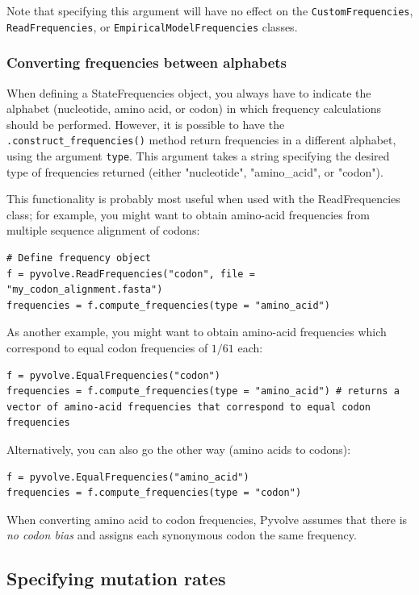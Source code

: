 \documentclass{article}
\newcommand{\code}[1]{\texttt{\small{#1}}}
\begin{document}
Note that specifying this argument will have no effect on the \code{CustomFrequencies}, \code{ReadFrequencies}, or \code{EmpiricalModelFrequencies} classes.






\subsubsection{Converting frequencies between alphabets}

When defining a StateFrequencies object, you always have to indicate the alphabet (nucleotide, amino acid, or codon) in which frequency calculations should be performed. However, it is possible to have the \code{.construct\_frequencies()} method return frequencies in a different alphabet, using the argument \code{type}. This argument takes a string specifying the desired type of frequencies returned (either "nucleotide", "amino\_acid", or "codon").

This functionality is probably most useful when used with the ReadFrequencies class; for example, you might want to obtain amino-acid frequencies from multiple sequence alignment of codons:
\begin{lstlisting}
# Define frequency object
f = pyvolve.ReadFrequencies("codon", file = "my_codon_alignment.fasta")
frequencies = f.compute_frequencies(type = "amino_acid")
\end{lstlisting}

As another example, you might want to obtain amino-acid frequencies which correspond to equal codon frequencies of $1/61$ each:
\begin{lstlisting}
f = pyvolve.EqualFrequencies("codon")
frequencies = f.compute_frequencies(type = "amino_acid") # returns a vector of amino-acid frequencies that correspond to equal codon frequencies
\end{lstlisting}

Alternatively, you can also go the other way (amino acids to codons):
\begin{lstlisting}
f = pyvolve.EqualFrequencies("amino_acid")
frequencies = f.compute_frequencies(type = "codon")
\end{lstlisting}
When converting amino acid to codon frequencies, Pyvolve assumes that there is \emph{no codon bias} and assigns each synonymous codon the same frequency.



\subsection{Specifying mutation rates}\label{sec:mu}
\end{document}
